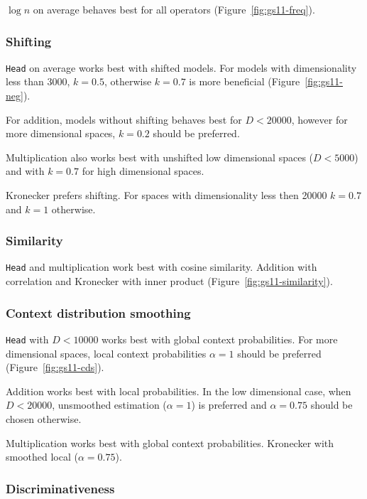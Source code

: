 $\log n$ on average behaves best for all operators (Figure~\ref{fig:gs11-freq}).

\subsubsection{Shifting}

\texttt{Head} on average works best with shifted models. For models with dimensionality less than 3000, $k = 0.5$, otherwise $k = 0.7$ is more beneficial (Figure~\ref{fig:gs11-neg}).

For addition, models without shifting behaves best for $D < 20000$, however for more dimensional spaces, $k = 0.2$ should be preferred.

Multiplication also works best with unshifted low dimensional spaces ($D < 5000$) and with $k = 0.7$ for high dimensional spaces.

Kronecker prefers shifting. For spaces with dimensionality less then 20000 $k = 0.7$ and $k = 1$ otherwise.

\subsubsection{Similarity}



\texttt{Head} and multiplication work best with cosine similarity. Addition with correlation and Kronecker with inner product (Figure~\ref{fig:gs11-similarity}).

\subsubsection{Context distribution smoothing}

\texttt{Head} with $D < 10000$ works best with global context probabilities. For more dimensional spaces, local context probabilities $\alpha = 1$ should be preferred (Figure~\ref{fig:gs11-cds}).

Addition works best with local probabilities. In the low dimensional case, when $D < 20000$, unsmoothed estimation ($\alpha = 1$) is preferred and $\alpha = 0.75$ should be chosen otherwise.

Multiplication works best with global context probabilities. Kronecker with smoothed local ($\alpha = 0.75$).

\subsubsection{Discriminativeness}

